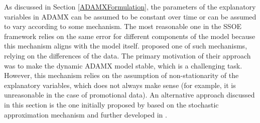 \documentclass[]{book}
\theoremstyle{definition}
\theoremstyle{definition}
\theoremstyle{definition}
\theoremstyle{definition}
\theoremstyle{remark}
\begin{document}
As discussed in Section \ref{ADAMXFormulation}, the parameters of the explanatory variables in ADAMX can be assumed to be constant over time or can be assumed to vary according to some mechanism. The most reasonable one in the SSOE framework relies on the same error for different components of the model because this mechanism aligns with the model itself. \citet{Osman2015} proposed one of such mechanisms, relying on the differences of the data. The primary motivation of their approach was to make the dynamic ADAMX model stable, which is a challenging task. However, this mechanism relies on the assumption of non-stationarity of the explanatory variables, which does not always make sense (for example, it is unreasonable in the case of promotional data). An alternative approach discussed in this section is the one initially proposed by \citet{Svetunkov1985} based on the stochastic approximation mechanism and further developed in \citet{Svetunkov2014Textbook}.
\end{document}
